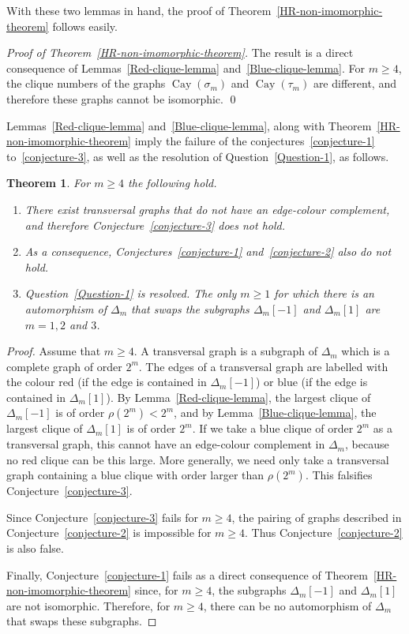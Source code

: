 \documentclass[12pt,a4paper]{article}
\newcommand{\Cay}{\operatorname{Cay}}
\newtheorem{Theorem}{Theorem}
\newenvironment{proofof}[1]{\noindent\emph{Proof of #1.}}{\qed}
\begin{document}
With these two lemmas in hand, the proof of Theorem~\ref{HR-non-imomorphic-theorem} follows easily.

\begin{proofof}{Theorem~\ref{HR-non-imomorphic-theorem}}
The result is a direct consequence of Lemmas~\ref{Red-clique-lemma} and~\ref{Blue-clique-lemma}.
For $m \geqslant 4$, the clique numbers of the graphs $\Cay(\sigma_m)$ and $\Cay(\tau_m)$ are different,
and therefore these graphs cannot be isomorphic.
\end{proofof}

Lemmas~\ref{Red-clique-lemma} and~\ref{Blue-clique-lemma}, along with Theorem~\ref{HR-non-imomorphic-theorem}
imply the failure of the conjectures~\ref{conjecture-1} to~\ref{conjecture-3}, as well as the resolution of Question~\ref{Question-1}, as follows.
\begin{Theorem}
\label{Conjectures-are-false-theorem}
For $m \geqslant 4$ the following hold.
\begin{enumerate}
 \item 
There exist transversal graphs that do not have an edge-colour complement, and
therefore Conjecture~\ref{conjecture-3} does not hold.
\item
As a consequence, Conjectures~\ref{conjecture-1} and~\ref{conjecture-2} also do not hold.
\item
Question~\ref{Question-1} is resolved.
The only $m \geqslant 1$ for which there is an automorphism of $\varDelta_m$ 
that swaps the subgraphs $\varDelta_m[-1]$ and $\varDelta_m[1]$
are $m=1,2$ and $3$.
\end{enumerate}

\end{Theorem}

\begin{proof}
Assume that $m \geqslant 4$.
A transversal graph is a subgraph of $\varDelta_m$ which is a complete graph of order $2^m$.
The edges of a transversal graph are labelled with the colour red (if the edge is contained in $\varDelta_m[-1]$) or blue
(if the edge is contained in $\varDelta_m[1]$).
By Lemma~\ref{Red-clique-lemma}, the largest clique of $\varDelta_m[-1]$ is of order $\rho(2^m) < 2^m$,
and by Lemma~\ref{Blue-clique-lemma}, the largest clique of $\varDelta_m[1]$ is of order $2^m$.
If we take a blue clique of order $2^m$ as a transversal graph, this cannot have an edge-colour complement
in $\varDelta_m$, because no red clique can be this large.
More generally, we need only take a transversal graph containing a blue clique with order larger than $\rho(2^m)$.
This falsifies Conjecture~\ref{conjecture-3}.

Since Conjecture~\ref{conjecture-3} fails for $m \geqslant 4$, 
the pairing of graphs described in Conjecture~\ref{conjecture-2} is impossible for $m \geqslant 4$.
Thus Conjecture~\ref{conjecture-2} is also false.

Finally, Conjecture~\ref{conjecture-1} fails as a direct consequence of Theorem~\ref{HR-non-imomorphic-theorem}
since, for $m \geqslant 4$, the subgraphs $\varDelta_m[-1]$ and $\varDelta_m[1]$are not isomorphic.
Therefore, for $m \geqslant 4$,  there can be no automorphism of $\varDelta_m$ that swaps these subgraphs. 
\end{proof}
\end{document}
